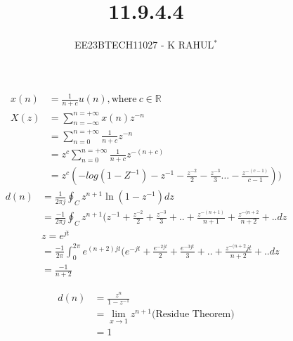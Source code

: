 \documentclass[journal,12pt,twocolumn]{IEEEtran}
\theoremstyle{remark}
\begin{document}

\vspace{3cm}
\title{11.9.4.4}
\author{EE23BTECH11027 - K RAHUL$^{*}$%
}
\maketitle
\newpage
\bigskip
\renewcommand{\thefigure}{\theenumi}
\renewcommand{\thetable}{\theenumi}
\begin{align}\label{11027_eq1}
    x(n) &= \frac{1}{n+c} u(n),\text{where} \: c \in \mathbb{R}\\
    X(z) &= \sum_{n= -\infty}^{n= +\infty} x(n)z^{-n}\\
    &=\sum_{n = 0}^{n = +\infty} \frac{1}{n+c}z^{-n}\\
    &= z^c\sum_{n = 0}^{n = +\infty} \frac{1}{n+c}z^{-(n+c)}\\
    &= z^c(-log(1-Z^{-1}) - z^{-1}-\frac{z^{-2}}{2}-\frac{z^{-3}}{3} \ldots -\frac{z^{-(c-1)}}{c-1}))
\end{align}
\begin{align}\label{11027_eq2}
    d(n)&=\frac{1}{2\pi j} \oint _C z^{n+1}\ln{(1-z^{-1})}dz\\
    &=\frac{-1}{2\pi j} \oint _C z^{n+1}(z^{-1}+\frac{z^{-2}}{2} + \frac{z^{-3}}{3}+.. + \frac{z^{-(n+1)}}{n+1}+ \frac{z^{-(n+2}}{n+2}+.. dz\\
    &z=e^{jt}\\
    &=\frac{-1}{2\pi} \int_{0}^{2\pi} e^{(n+2)jt}(e^{-jt}+\frac{e^{-2jt}}{2} + \frac{e^{-3jt}}{3}+.. +\frac{z^{-(n+2}jt}{n+2}+.. dz\\
    &=\frac{-1}{n+2}
\end{align}

\begin{align}\label{11027_eq3}
    d(n)&= \frac{z^n}{1-z^{-1}}\\
    &= \lim_{x \to 1}z^{n+1} \text{(Residue Theorem)}\\
    &= 1
\end{align}
\end{document}
